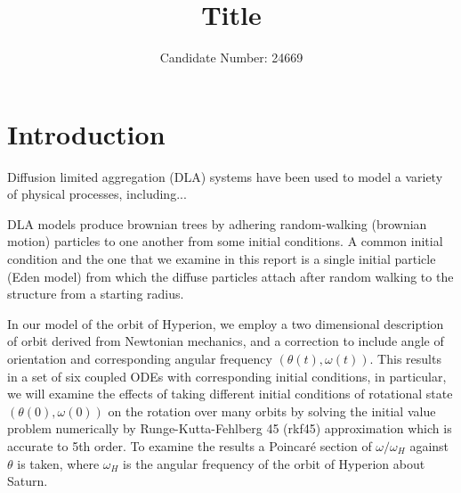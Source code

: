 \documentclass[10pt, twocolumn]{article} %
\title{\textbf{Title}}
\author{Candidate Number: 24669}
\affil{Department of Physics, University of Bath, Bath BA2 7AY, United Kingdom}
\begin{document}
\medskip

\section*{Introduction}
  Diffusion limited aggregation (DLA) systems have been used to model a variety of physical processes, including...

  DLA models produce brownian trees by adhering random-walking (brownian motion) particles to one another from some initial conditions. A common initial condition and the one that we examine in this report is a single initial particle (Eden model) from which the diffuse particles attach after random walking to the structure from a starting radius.

In our model of the orbit of Hyperion, we employ a two dimensional description of orbit derived from Newtonian mechanics\cite{Newtonian_orbit}, and a correction to include angle of orientation and corresponding angular frequency $(\theta(t), \omega(t))$. This results in a set of six coupled ODEs with corresponding initial conditions, in particular, we will examine the effects of taking different initial conditions of rotational state $(\theta(0),\omega(0))$ on the rotation over many orbits by solving the initial value problem numerically by Runge-Kutta-Fehlberg 45 (rkf45) approximation which is accurate to 5th order. To examine the results a Poincar\'e section of $\omega / \omega_H$ against $\theta$ is taken, where $\omega_H$ is the angular frequency of the orbit of Hyperion about Saturn.
\end{document}
